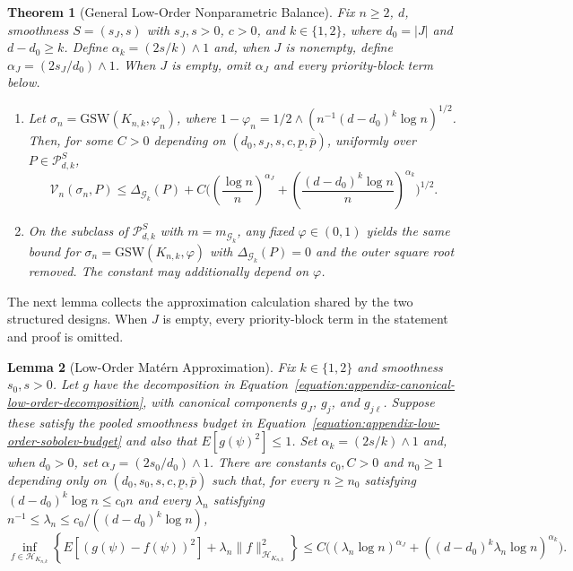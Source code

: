 \documentclass[letterpaper,12pt]{article}
\newtheorem{thm}{Theorem}[section]
\newtheorem{lem}[thm]{Lemma}
\theoremstyle{definition}
\numberwithin{equation}{section}
\newcommand{\mc}{\mathcal}
\newcommand{\norm}[1]{\lVert#1\rVert}
\begin{document}
\begin{thm}[General Low-Order Nonparametric Balance]\label{theorem:proof-general-low-order-gsw}
Fix $n\geq2$, $d$, smoothness $S=(s_J,s)$ with $s_J,s>0$, $c>0$, and $k\in\{1,2\}$, where $d_0=|J|$ and $d-d_0\geq k$.
Define $\alpha_k=(2s/k)\wedge1$ and, when $J$ is nonempty, define $\alpha_J=(2s_J/d_0)\wedge1$.
When $J$ is empty, omit $\alpha_J$ and every priority-block term below.
\begin{enumerate}[label={\rm(\roman*)}]
\item Let $\sigma_n=\mathrm{GSW}(K_{n,k},\varphi_n)$, where $1-\varphi_n=1/2\wedge(n^{-1}(d-d_0)^k\log n)^{1/2}$.
Then, for some $C>0$ depending on $(d_0,s_J,s,c,\underline p,\overline p)$, uniformly over $P\in\mc P_{d,k}^{S}$,
\begin{equation}\label{equation:proof-general-low-order-gsw}
\mc V_n(\sigma_n,P)\leq\Delta_{\mc G_k}(P)+C\bigg(\left(\frac{\log n}{n}\right)^{\alpha_J}+\left(\frac{(d-d_0)^k\log n}{n}\right)^{\alpha_k}\bigg)^{1/2}.
\end{equation}
\item On the subclass of $\mc P_{d,k}^{S}$ with $m=m_{\mc G_k}$, any fixed $\varphi\in(0,1)$ yields the same bound for $\sigma_n=\mathrm{GSW}(K_{n,k},\varphi)$ with $\Delta_{\mc G_k}(P)=0$ and the outer square root removed. The constant may additionally depend on $\varphi$.
\end{enumerate}
\end{thm}

The next lemma collects the approximation calculation shared by the two structured designs.
When $J$ is empty, every priority-block term in the statement and proof is omitted.

\begin{lem}[Low-Order Mat\'ern Approximation]\label{lemma:proof-low-order-matern-approximation}
Fix $k\in\{1,2\}$ and smoothness $s_0,s>0$.
Let $g$ have the decomposition in Equation~\eqref{equation:appendix-canonical-low-order-decomposition}, with canonical components $g_J$, $g_j$, and $g_{j\ell}$. Suppose these satisfy the pooled smoothness budget in Equation~\eqref{equation:appendix-low-order-sobolev-budget} and also that $E[g(\psi)^2]\leq1$.
Set $\alpha_k=(2s/k)\wedge1$ and, when $d_0>0$, set $\alpha_J=(2s_0/d_0)\wedge1$.
There are constants $c_0,C>0$ and $n_0\geq1$ depending only on $(d_0,s_0,s,c,\underline p,\overline p)$ such that, for every $n\geq n_0$ satisfying $(d-d_0)^k\log n\leq c_0n$ and every $\lambda_n$ satisfying $n^{-1}\leq\lambda_n\leq c_0/((d-d_0)^k\log n)$,
\begin{equation*}
\inf_{f\in\mc H_{K_{n,k}}}\left\{E[(g(\psi)-f(\psi))^2]+\lambda_n\norm{f}_{\mc H_{K_{n,k}}}^2\right\}\leq C\bigl((\lambda_n\log n)^{\alpha_J}+((d-d_0)^k\lambda_n\log n)^{\alpha_k}\bigr).
\end{equation*}
\end{lem}
\end{document}

